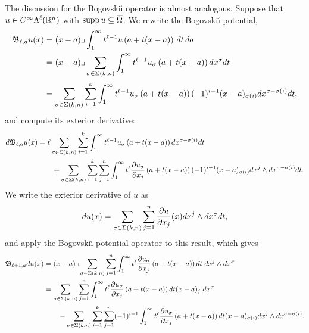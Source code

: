 \documentclass[12pt,a4paper]{article}
\begin{document}
The discussion for the Bogovski\u{\i} operator is almost analogous. 
Suppose that $u \in C^{\infty}\Lambda^{\ell}({\mathbb R}^n)$ with $\operatorname{supp} u \subseteq \overline\Omega$.
We rewrite the Bogovski\u{\i} potential,
\begin{align*}
    {\mathfrak B}_{\ell,a} u(x) 
    &= 
    (x-a)\lrcorner \int_{1}^\infty t^{\ell-1} u\left(a+t(x-a)\right)\,dt\,da\;
    \\&
    = 
    (x-a)\lrcorner 
    \sum_{\sigma \in \Sigma(k,n)}
    \int_{1}^\infty 
    t^{\ell-1} u_{\sigma}\left(a+t(x-a)\right) dx^{\sigma} dt 
    \\&
    = 
    \sum_{\sigma \in \Sigma(k,n)} \sum_{i=1}^{k}
    \int_{1}^\infty 
    t^{\ell-1} u_{\sigma}\left(a+t(x-a)\right) (-1)^{i-1} (x-a)_{\sigma(i) } dx^{\sigma-\sigma(i)} dt 
    ,
\end{align*}
and compute its exterior derivative:
\begin{align*}
    d {\mathfrak B}_{\ell,a} u(x) 
    &= 
    \ell 
    \sum_{\sigma \in \Sigma(k,n)} \sum_{i=1}^{k}
    \int_{1}^\infty 
    t^{\ell-1} u_{\sigma}\left(a+t(x-a)\right) dx^{\sigma-\sigma(i)} dt 
    \\&\qquad
    + 
    \sum_{\sigma \in \Sigma(k,n)} \sum_{i=1}^{k} \sum_{j=1}^{n}
    \int_{1}^\infty 
    t^{\ell} \frac{ \partial u_{\sigma} }{\partial x_{j}}\left(a+t(x-a)\right) (-1)^{i-1} (x-a)_{\sigma(i) } dx^{j} \wedge dx^{\sigma-\sigma(i)} dt 
    .
\end{align*}
We write the exterior derivative of $u$ as 
\begin{align*}
    d u(x)
    =
    \sum_{\sigma \in \Sigma(k,n)} \sum_{j=1}^{n}
    \frac{ \partial u }{\partial x_{j}}(x) dx^{j} \wedge dx^{\sigma} dt 
    ,
\end{align*}
and apply the Bogovski\u{\i} potential operator to this result, which gives 
\begin{align*}
    {\mathfrak B}_{\ell+1,a} d u(x)
    &=
    (x-a)\lrcorner 
    \sum_{\sigma \in \Sigma(k,n)} \sum_{j=1}^{n}
    \int_{1}^\infty t^{\ell} \frac{ \partial u_{\sigma} }{\partial x_{j}}\left(a+t(x-a)\right) dt 
    \;dx^{j} \wedge dx^{\sigma}
    \\&
    = 
    \sum_{\sigma \in \Sigma(k,n)} \sum_{j=1}^{n}
    \int_{1}^\infty t^{\ell} \frac{ \partial u_{\sigma} }{\partial x_{j}}\left(a+t(x-a)\right) dt (x-a)_{j}
    \;dx^{\sigma}
    \\&\qquad 
    - 
    \sum_{\sigma \in \Sigma(k,n)} \sum_{i=1}^{k} \sum_{j=1}^{n}
    (-1)^{i-1}
    \int_{1}^\infty t^{\ell} \frac{ \partial u_{\sigma} }{\partial x_{j}}\left(a+t(x-a)\right) dt 
    (x-a)_{\sigma(i)} dx^{j} \wedge dx^{\sigma-\sigma(i)}
    .
\end{align*}
\end{document}
